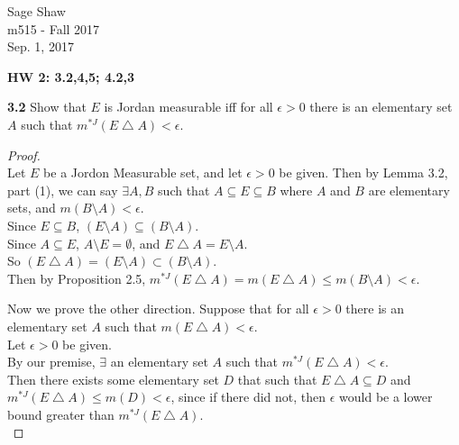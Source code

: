 \documentclass[12pt]{article}
\begin{document}
	\thispagestyle{empty}
	
\begin{flushright}
	Sage Shaw \\
	m515 - Fall 2017 \\
	Sep. 1, 2017
\end{flushright}
	
{\large \textbf{HW 2: 3.2,4,5; 4.2,3}}\bigbreak

\hspace{-4 ex}\textbf{3.2} Show that $E$ is Jordan measurable iff for all $\epsilon>0$ there is an elementary set $A$ such that $m^{*J}(E\bigtriangleup A)<\epsilon$. \bigbreak

	\begin{proof}\text{ }\\
		Let $E$ be a Jordon Measurable set, and let $\epsilon >0$ be given. Then by Lemma 3.2, part (1), we can say $\exists A,B$ such that $A \subseteq E \subseteq B$ where $A$ and $B$ are elementary sets, and $m(B\setminus A)< \epsilon$. \\
		Since $E \subseteq B$, $(E \setminus A) \subseteq (B \setminus A)$. \\
		Since $A \subseteq E$, $A \setminus E = \emptyset$, and $E \bigtriangleup A = E \setminus A$. \\ 
		So $(E \bigtriangleup A) = (E \setminus A) \subset (B \setminus A)$.\\
		Then by Proposition 2.5, $m^{*J}(E \bigtriangleup A) = m(E \bigtriangleup A) \leq m(B \setminus A) < \epsilon$.\bigbreak
		
		Now we prove the other direction. Suppose that for all $\epsilon>0$ there is an elementary set $A$ such that $m(E\bigtriangleup A)<\epsilon$.\\
		
		Let $\epsilon > 0$ be given. \\
		
		By our premise, $\exists $ an elementary set $A$ such that $m^{*J}(E\bigtriangleup A)<\epsilon$. \\
		
		Then there exists some elementary set $D$ that such that $E \bigtriangleup A \subseteq D$ and $m^{*J}(E\bigtriangleup A) \leq m(D) < \epsilon$, since if there did not, then $\epsilon$ would be a lower bound greater than $m^{*J}(E\bigtriangleup A)$. \\
		

\end{proof}
\end{document}
